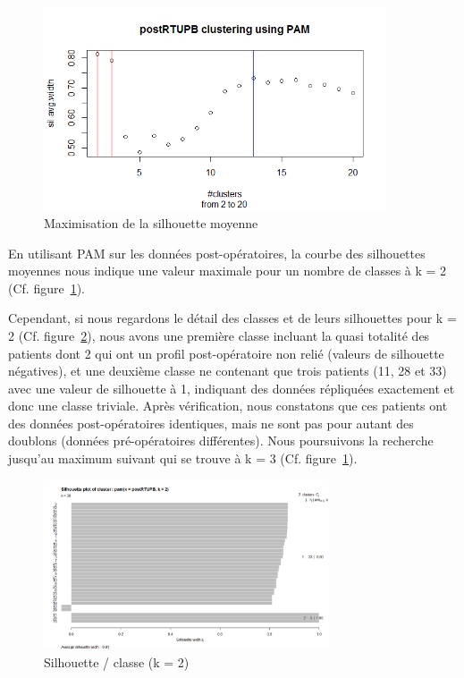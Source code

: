 %
%

\begin{figure}[H]
\centering
\includegraphics[width=0.90\textwidth]{../Fig/RTUPB/rtupb-elbow-post.png}
\caption{Maximisation de la silhouette moyenne }
\label{fig-rtupb-post-elbow}
\end{figure}

En utilisant PAM sur les données post-opératoires, la courbe des silhouettes moyennes
nous indique une valeur maximale pour un nombre de classes à k = 2 (Cf. figure~\ref{fig-rtupb-post-elbow}).

Cependant, si nous regardons le détail des classes et de leurs silhouettes pour k = 2 (Cf. figure~\ref{fig-rtupb-post-pam-k2}),
nous avons une première classe incluant la quasi totalité des patients dont 2 qui ont un profil post-opératoire non relié (valeurs de silhouette négatives), et une deuxième classe ne contenant que trois patients (11, 28 et 33)
avec une valeur de silhouette à 1, indiquant des données répliquées exactement et donc une classe triviale.
Après vérification, nous constatons que ces patients ont des données post-opératoires identiques, mais ne sont pas pour autant des doublons (données pré-opératoires différentes). Nous poursuivons la recherche jusqu'au maximum suivant qui se trouve à k = 3 (Cf. figure~\ref{fig-rtupb-post-elbow}).

\begin{figure}[H]
\centering
\includegraphics[width=0.75\textwidth]{../Fig/RTUPB/rtupb-sil-k2-post.png}
\caption[]{Silhouette / classe (k = 2) }
\label{fig-rtupb-post-pam-k2}
\end{figure}

